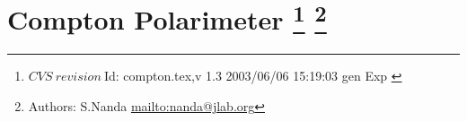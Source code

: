 \newpage
\section[Compton Polarimeter]{Compton Polarimeter
\footnote{
  $CVS~revision~ $Id: compton.tex,v 1.3 2003/06/06 15:19:03 gen Exp $ $
}
\footnote{Authors: S.Nanda \url{mailto:nanda@jlab.org}}
}

%
%
%
